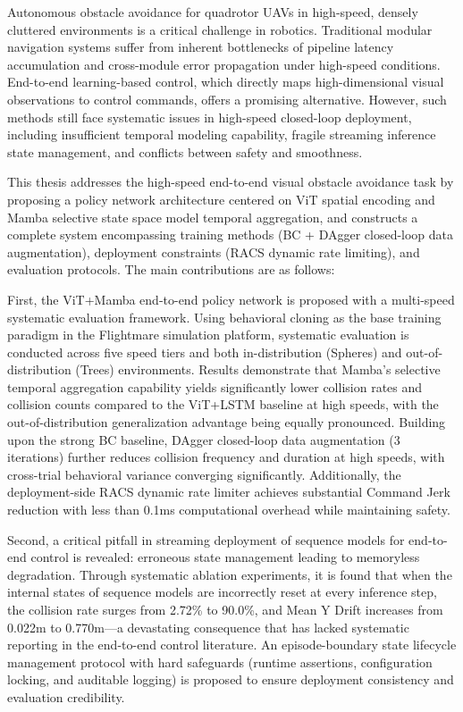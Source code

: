 \begin{englishabstract}

Autonomous obstacle avoidance for quadrotor UAVs in high-speed, densely cluttered environments is a critical challenge in robotics. Traditional modular navigation systems suffer from inherent bottlenecks of pipeline latency accumulation and cross-module error propagation under high-speed conditions. End-to-end learning-based control, which directly maps high-dimensional visual observations to control commands, offers a promising alternative. However, such methods still face systematic issues in high-speed closed-loop deployment, including insufficient temporal modeling capability, fragile streaming inference state management, and conflicts between safety and smoothness.

This thesis addresses the high-speed end-to-end visual obstacle avoidance task by proposing a policy network architecture centered on ViT spatial encoding and Mamba selective state space model temporal aggregation, and constructs a complete system encompassing training methods (BC + DAgger closed-loop data augmentation), deployment constraints (RACS dynamic rate limiting), and evaluation protocols. The main contributions are as follows:

First, the ViT+Mamba end-to-end policy network is proposed with a multi-speed systematic evaluation framework. Using behavioral cloning as the base training paradigm in the Flightmare simulation platform, systematic evaluation is conducted across five speed tiers and both in-distribution (Spheres) and out-of-distribution (Trees) environments. Results demonstrate that Mamba's selective temporal aggregation capability yields significantly lower collision rates and collision counts compared to the ViT+LSTM baseline at high speeds, with the out-of-distribution generalization advantage being equally pronounced. Building upon the strong BC baseline, DAgger closed-loop data augmentation (3 iterations) further reduces collision frequency and duration at high speeds, with cross-trial behavioral variance converging significantly. Additionally, the deployment-side RACS dynamic rate limiter achieves substantial Command Jerk reduction with less than 0.1ms computational overhead while maintaining safety.

Second, a critical pitfall in streaming deployment of sequence models for end-to-end control is revealed: erroneous state management leading to memoryless degradation. Through systematic ablation experiments, it is found that when the internal states of sequence models are incorrectly reset at every inference step, the collision rate surges from 2.72\% to 90.0\%, and Mean Y Drift increases from 0.022m to 0.770m---a devastating consequence that has lacked systematic reporting in the end-to-end control literature. An episode-boundary state lifecycle management protocol with hard safeguards (runtime assertions, configuration locking, and auditable logging) is proposed to ensure deployment consistency and evaluation credibility.


\end{englishabstract}
